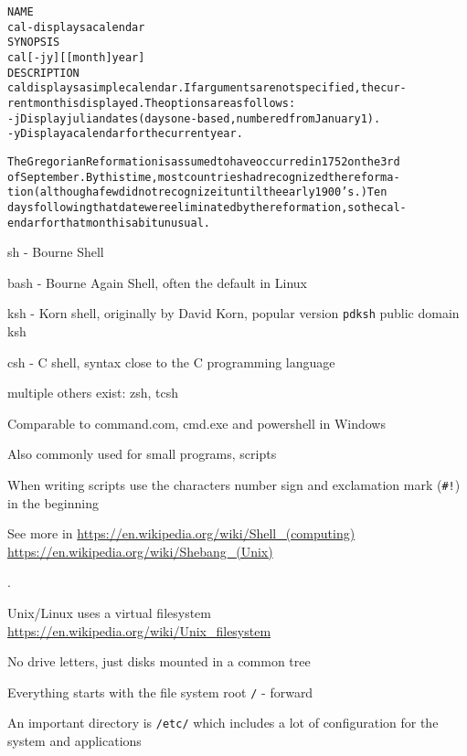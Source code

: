 \documentclass[Screen16to9,17pt]{foils}
\begin{document}
\begin{alltt}\footnotesize
\small
NAME
     cal - displays a calendar
SYNOPSIS
     cal [-jy] [[month]  year]
DESCRIPTION
   cal displays a simple calendar.  If arguments are not specified, the cur-
   rent month is displayed.  The options are as follows:
   -j      Display julian dates (days one-based, numbered from January 1).
   -y      Display a calendar for the current year.

The Gregorian Reformation is assumed to have occurred in 1752 on the 3rd
of September.  By this time, most countries had recognized the reforma-
tion (although a few did not recognize it until the early 1900's.)  Ten
days following that date were eliminated by the reformation, so the cal-
endar for that month is a bit unusual.
\end{alltt}



  \begin{list2}
    \item sh - Bourne Shell
\item bash - Bourne Again Shell, often the default in Linux
\item ksh - Korn shell, originally by David Korn, popular version \verb+pdksh+ public domain ksh
\item csh - C shell, syntax close to the C programming language
\item multiple others exist: zsh, tcsh
  \end{list2}
\begin{list1}
\item Comparable to command.com, cmd.exe and powershell in Windows
\item Also commonly used for small programs, scripts
\item When writing scripts use the characters number sign and exclamation mark (\verb+#!+) in the beginning
\end{list1}

See more in \url{https://en.wikipedia.org/wiki/Shell_(computing)}\\
\url{https://en.wikipedia.org/wiki/Shebang_(Unix)}


.
\begin{list2}

\item Unix/Linux uses a virtual filesystem\\
\url{https://en.wikipedia.org/wiki/Unix_filesystem}
\item No drive letters, just disks mounted in a common tree
\item Everything starts with the file system root \verb+/+ - forward
\item An important directory is \verb+/etc/+ which includes a lot of configuration for the system and applications
\end{list2}




\end{document}
